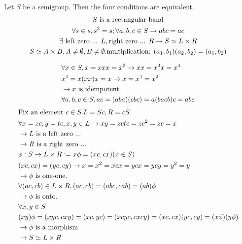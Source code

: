 
\begin{Them}
    Let $S$ be a semigroup. Then the four conditions are equivalent.
    \begin{gather*}
        S \text{\space is a rectangular band}   \\
        \forall s \in s, s^2=s; \forall a,b,c \in S \rightarrow abc=ac  \\
        \exists \text{\space left zero ... } L,\text{right zero ... }R\rightarrow S \simeq L \times R   \\
        S\simeq A\times B, A\neq \emptyset,B\neq \emptyset. \text{multiplication: } (a_1,b_1)(a_2,b_2)=(a_1,b_2)
    \end{gather*}

    \begin{Prof}
        \begin{align*}
            &\forall x \in S, x=xxx=x^3\rightarrow xx=x^3x=x^4   \\
            &x^4=x(xx)x=x \rightarrow x=x^4=x^2 \\
            &\rightarrow x \text{\space is idempotent.} \\
            &\forall a,b,c \in S,ac=(aba)(cbc)=a(bacb)c=abc
        \end{align*}
        \begin{align*}
            &\text{Fix an element } c\in S. L=Sc, R=cS\\
            &\forall x=zc,y=tc, x,y\in L \rightarrow xy=zctc=zc^2=zc=x  \\
            &\rightarrow L \text{\space is a left zero ...} \\
            &\rightarrow R \text{\space is a right zero ...}    \\
            &\phi:S\rightarrow L\times R:=x\phi=(xc, cx)(x\in S)    \\
            &(xc,cx)=(yc,cy) \rightarrow x=x^2=xcx=ycx=ycy=y^2=y    \\
            &\rightarrow \phi \text{\space is one-one.}    \\
            &\forall (ac,cb)\in L\times R, (ac,cb)=(abc,cab)=(ab)\phi   \\
            &\rightarrow \phi \text{\space is onto.}    \\
            &\forall x,y \in S  \\
            &(xy)\phi=(xyc,cxy)=(xc,yc)=(xcyc,cxcy)=(xc,cx)(yc,cy)=(x\phi)(y\phi)   \\
            &\rightarrow \phi \text{\space is a morphism.}  \\
            &\rightarrow S\simeq L\times R
        \end{align*}


\end{Prof}
\end{Them}
